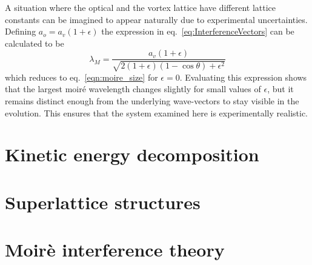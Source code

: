    A situation where the optical and the vortex lattice have different lattice constants can be imagined to appear naturally due to experimental uncertainties. Defining $a_o = a_v(1+\epsilon)$ the expression in eq.~\eqref{eq:InterferenceVectors} can be calculated to be
    \begin{equation}
    	\lambda_M = \frac{a_v(1+\epsilon)}{\sqrt{2(1+\epsilon)(1-\cos\theta) + \epsilon^2}}
    	\label{eqn:moire_size_eps}
    \end{equation}
    which reduces to eq.~\eqref{eqn:moire_size} for $\epsilon=0$. Evaluating this expression shows that the largest moir\'e wavelength changes slightly for small values of $\epsilon$, but it remains distinct enough from the underlying wave-vectors to stay visible in the evolution. This ensures that the system examined here is experimentally realistic.




\section{Kinetic energy decomposition}

\section{Superlattice structures}

\section{Moir\`e interference theory}
